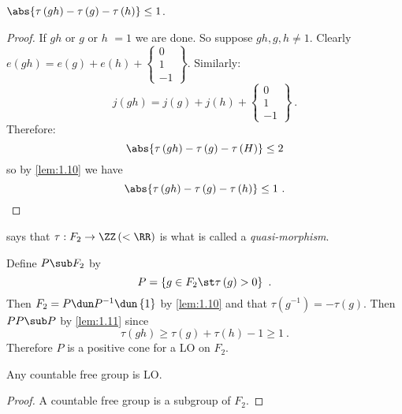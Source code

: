 \begin{Proof}
\begin{lem}
$\abs{\tau\left(gh\right) - \tau\left(g\right) - \tau\left(h\right)} \leq 1$.
\label{lem:1.11}
\end{lem}
\begin{proof}
If $gh$ or $g$ or $h$ $=1$ we are done. So suppose $gh, g, h\neq 1$.
Clearly $e\left(gh\right)= e\left(g\right) + e\left(h\right)+ 
\begin{Bmatrix}
0\\ 1 \\ -1
\end{Bmatrix}
$.
Similarly:
\begin{equation}
j\left(gh\right) = j\left(g\right) + j\left(h\right) + 
\begin{Bmatrix}
0\\ 1 \\ -1
\end{Bmatrix}
\ .
\end{equation}
Therefore:
\begin{equation}
\abs{\tau\left(gh\right) - \tau\left(g\right) - \tau\left(H\right)}\leq 2
\end{equation}
so by \cref{lem:1.10}
we have
\begin{equation}
\abs{\tau\left(gh\right) - \tau\left(g\right)-  \tau\left(h\right)}\leq 1 \ .
\end{equation}
\end{proof}
\begin{rmk}
 says that $\tau : F_2 \to \ZZ \left(< \RR\right)$ is what is called a
\emph{quasi-morphism}.
\end{rmk}

Define $P\sub F_2$ by
\begin{equation}
P = \left\{g\in F_2 \st \tau\left(g\right) > 0\right\} \ .
\end{equation}
Then $F_2 = P\dun P^{-1} \dun \left\{1\right\}$ by \cref{lem:1.10} and that
$\tau\left(g^{-1}\right) = -\tau\left(g\right)$.
Then $PP \sub P$ by \cref{lem:1.11} since
\begin{equation}
\tau\left(gh\right) \geq \tau\left(g\right) + \tau\left(h\right) - 1 \geq 1 \ .
\end{equation}
Therefore $P$ is a positive cone for a LO on $F_2$.
\end{Proof}

\begin{cor}
Any countable free group is LO.
\label{cor:1.12}
\end{cor}

\begin{proof}
A countable free group is a subgroup of $F_2$.
\end{proof}

